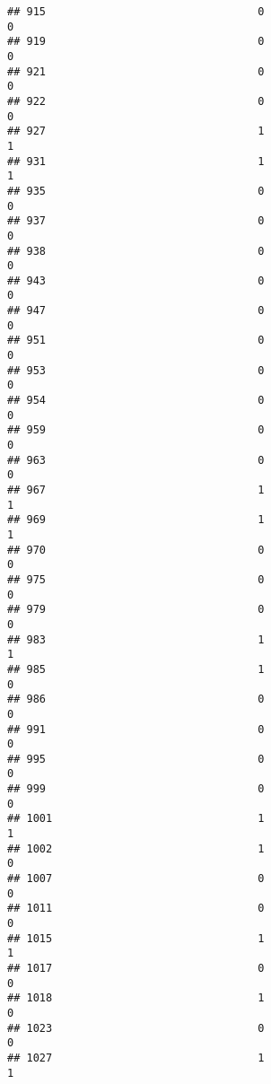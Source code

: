 \documentclass[
]{article}
\begin{document}
\begin{verbatim}
## 915                                 0                                0
## 919                                 0                                0
## 921                                 0                                0
## 922                                 0                                0
## 927                                 1                                1
## 931                                 1                                1
## 935                                 0                                0
## 937                                 0                                0
## 938                                 0                                0
## 943                                 0                                0
## 947                                 0                                0
## 951                                 0                                0
## 953                                 0                                0
## 954                                 0                                0
## 959                                 0                                0
## 963                                 0                                0
## 967                                 1                                1
## 969                                 1                                1
## 970                                 0                                0
## 975                                 0                                0
## 979                                 0                                0
## 983                                 1                                1
## 985                                 1                                0
## 986                                 0                                0
## 991                                 0                                0
## 995                                 0                                0
## 999                                 0                                0
## 1001                                1                                1
## 1002                                1                                0
## 1007                                0                                0
## 1011                                0                                0
## 1015                                1                                1
## 1017                                0                                0
## 1018                                1                                0
## 1023                                0                                0
## 1027                                1                                1

\end{verbatim}
\end{document}
